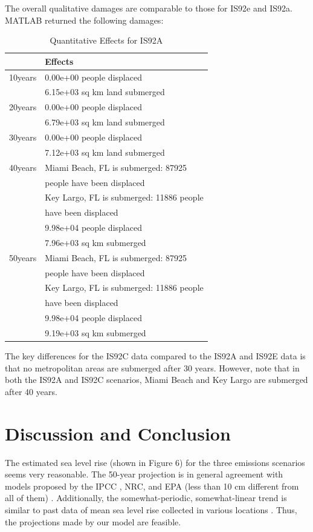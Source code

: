 \documentclass[12pt,a4paper,titlepage]{article}
\begin{document}
The overall qualitative damages are comparable to those for IS92e
and IS92a. MATLAB returned the following damages:
\begin{table}[!htb]
\centering \caption{Quantitative Effects for IS92A}
\begin{tabular}{|l|l|}
\hline
 & Effects \\
\hline
10years & 0.00e+00 people displaced \\
\cline{2-2}
 & 6.15e+03 sq km land submerged \\
\hline
20years & 0.00e+00 people displaced \\
\cline{2-2}
 & 6.79e+03 sq km land submerged \\
\hline
30years & 0.00e+00 people displaced \\
\cline{2-2}
 & 7.12e+03 sq km land submerged \\
\hline
40years & Miami Beach, FL is submerged: 87925 \\
 & people have been displaced \\
 & Key Largo, FL is submerged: 11886 people \\
 & have been displaced \\
\cline{2-2}
 & 9.98e+04 people displaced \\
 & 7.96e+03 sq km submerged \\
\hline
50years & Miami Beach, FL is submerged: 87925 \\
 & people have been displaced \\
 & Key Largo, FL is submerged: 11886 people \\
 & have been displaced \\
\cline{2-2}
 & 9.98e+04 people displaced \\
 & 9.19e+03 sq km submerged \\
\hline
\end{tabular}
\end{table}


The key differences for the IS92C data compared to the IS92A and
IS92E data is that no metropolitan areas are submerged after 30
years. However, note that in both the IS92A and IS92C scenarios,
Miami Beach and Key Largo are submerged after 40 years.

\section{Discussion and Conclusion}

The estimated sea level rise (shown in Figure 6) for the three
emissions scenarios seems very reasonable. The 50-year projection
is in general agreement with models proposed by the IPCC , NRC,
and EPA (less than 10 cm different from all of them) .
Additionally, the somewhat-periodic, somewhat-linear trend is
similar to past data of mean sea level rise collected in various
locations . Thus, the projections made by our model are feasible.
\end{document}

